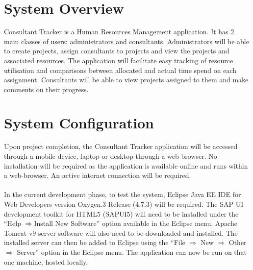 \documentclass[a4paper, 12pt, oneside]{article}
\begin{document}
\newpage
\tableofcontents
\newpage




\pagebreak



\section{System Overview}



Consultant Tracker is a Human Resources Management application. It has 2 main classes of users: administrators and consultants. Administrators will be able to create projects, assign consultants to projects and view the projects and associated resources. The application will facilitate easy tracking of resource utilisation and comparisons between allocated and actual time spend on each assignment. Consultants will be able to view projects assigned to them and make comments on their progress.



\section{System Configuration}



Upon project completion, the Consultant Tracker application will be accessed through a mobile device, laptop or desktop through a web browser. No installation will be required as the application is available online and runs within a web-browser. An active internet connection will be required.\\ \\
In the current development phase, to test the system, Eclipse Java EE IDE for Web Developers version Oxygen.3 Release (4.7.3) will be required. The SAP UI development toolkit for HTML5 (SAPUI5) will need to be installed under the “Help $\Rightarrow$Install New Software” option available in the Eclipse menu. Apache Tomcat v9 server software will also need to be downloaded and installed. The installed server can then be added to Eclipse using the “File $\Rightarrow$ New $\Rightarrow$ Other $\Rightarrow$ Server” option in the Eclipse menu.  The application can now be run on that one machine, hosted locally.
\end{document}

